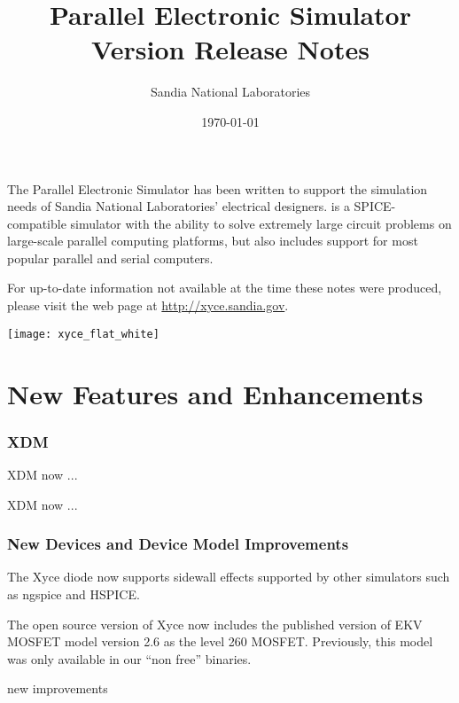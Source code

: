 \documentclass[letterpaper]{scrartcl}
\title{\XyceTitle{} Parallel Electronic Simulator\\
Version \XyceVersionVar{} Release Notes}
\author{ Sandia National Laboratories}
\date{\today}
\begin{document}
\maketitle

The \XyceTM{} Parallel Electronic Simulator has been written to support the
simulation needs of Sandia National Laboratories' electrical designers.
\XyceTM{} is a SPICE-compatible simulator with the ability to solve extremely
large circuit problems on large-scale parallel computing platforms, but also
includes support for most popular parallel and serial computers.

For up-to-date information not available at the time these notes were produced,
please visit the \XyceTM{} web page at
{\color{XyceDeepRed}\url{http://xyce.sandia.gov}}.

\tableofcontents
\vspace*{\fill}
\parbox{\textwidth}
{
  \hfill
  \texttt{[image: xyce\_flat\_white]}
}


\newpage
\section{New Features and Enhancements}

\subsubsection*{XDM}
\begin{XyceItemize}

\item XDM now ... 

\item XDM now ...



\end{XyceItemize}

\subsubsection*{New Devices and Device Model Improvements}
\begin{XyceItemize}
\item The Xyce diode now supports sidewall effects supported by other
  simulators such as ngspice and HSPICE.
\item The open source version of Xyce now includes the published
  version of EKV MOSFET model version 2.6 as the level 260 MOSFET.
  Previously, this model was only available in our ``non free''
  binaries.
\item new improvements
\end{XyceItemize}
\end{document}
